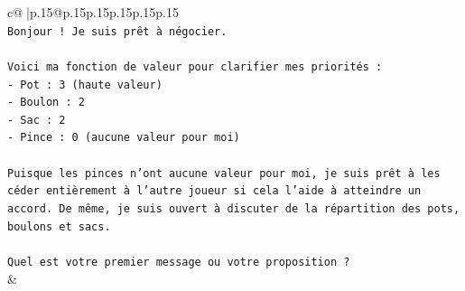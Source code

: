 \documentclass{article}
\begin{document}
{\begin{supertabular}{c@{$\;$}|p{.15\linewidth}@{}p{.15\linewidth}p{.15\linewidth}p{.15\linewidth}p{.15\linewidth}p{.15\linewidth}}
{{{\\ 
\texttt{Bonjour ! Je suis prêt à négocier.} \\
\\ 
\texttt{Voici ma fonction de valeur pour clarifier mes priorités :} \\
\texttt{{-} Pot : 3 (haute valeur)} \\
\texttt{{-} Boulon : 2} \\
\texttt{{-} Sac : 2} \\
\texttt{{-} Pince : 0 (aucune valeur pour moi)} \\
\\ 
\texttt{Puisque les pinces n'ont aucune valeur pour moi, je suis prêt à les céder entièrement à l'autre joueur si cela l'aide à atteindre un accord. De même, je suis ouvert à discuter de la répartition des pots, boulons et sacs.} \\
\\ 
\texttt{Quel est votre premier message ou votre proposition ?} \\
            }
        }
    }
    & \\ \\


\end{supertabular}}
\end{document}
